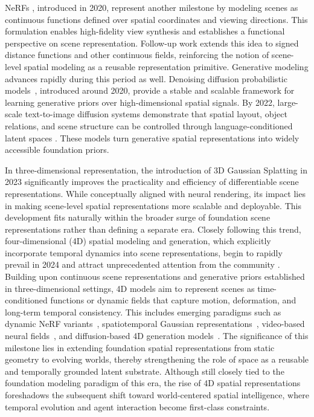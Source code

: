 NeRFs \cite{mildenhall2021nerf}, introduced in 2020, represent another milestone by modeling scenes as continuous functions defined over spatial coordinates and viewing directions.
This formulation enables high-fidelity view synthesis and establishes a functional perspective on scene representation.
Follow-up work extends this idea to signed distance functions and other continuous fields, reinforcing the notion of scene-level spatial modeling as a reusable representation primitive.
Generative modeling advances rapidly during this period as well.
Denoising diffusion probabilistic models~\cite{ho2020denoising}, introduced around 2020, provide a stable and scalable framework for learning generative priors over high-dimensional spatial signals.
By 2022, large-scale text-to-image diffusion systems demonstrate that spatial layout, object relations, and scene structure can be controlled through language-conditioned latent spaces \cite{rombach2022ldm}.
These models turn generative spatial representations into widely accessible foundation priors.



In three-dimensional representation, the introduction of 3D Gaussian Splatting \cite{kerbl20233d} in 2023 significantly improves the practicality and efficiency of differentiable scene representations.
While conceptually aligned with neural rendering, its impact lies in making scene-level spatial representations more scalable and deployable.
This development fits naturally within the broader surge of foundation scene representations rather than defining a separate era.
Closely following this trend, four-dimensional (4D) spatial modeling and generation, which explicitly incorporate temporal dynamics into scene representations, begin to rapidly prevail in 2024 and attract unprecedented attention from the community \cite{kong20253d}.
Building upon continuous scene representations and generative priors established in three-dimensional settings, 4D models aim to represent scenes as time-conditioned functions or dynamic fields that capture motion, deformation, and long-term temporal consistency.
This includes emerging paradigms such as dynamic NeRF variants~\cite{pumarola2021d,li2021neural}, spatiotemporal Gaussian representations~\cite{wu20244d,bian2025gsditadvancingvideogeneration}, video-based neural fields~\cite{liu2025free4d}, and diffusion-based 4D generation models~\cite{zhen2025tesseract}.
The significance of this milestone lies in extending foundation spatial representations from static geometry to evolving worlds, thereby strengthening the role of space as a reusable and temporally grounded latent substrate.
Although still closely tied to the foundation modeling paradigm of this era, the rise of 4D spatial representations foreshadows the subsequent shift toward world-centered spatial intelligence, where temporal evolution and agent interaction become first-class constraints.



